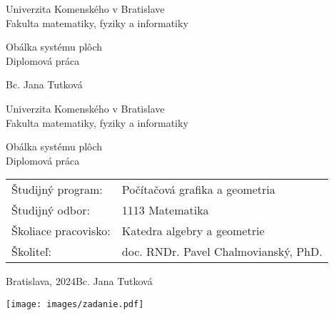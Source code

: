 \documentclass[12pt, twoside]{book}
\theoremstyle{definition}
\def\mfrok{2024}
\def\mfnazov{Obálka systému plôch}
\def\mftyp{Diplomová práca}
\def\mfautor{Bc. Jana Tutková}
\def\mfskolitel{doc. RNDr. Pavel Chalmovianský, PhD. }
\def\mfkonzultant{tit. Meno Priezvisko, tit. }
\def\mfmiesto{Bratislava, \mfrok}
\def\mfodbor{1113 Matematika}
\def\program{ Počítačová grafika a geometria }
\def\mfpracovisko{ Katedra algebry a geometrie }
\begin{document}
     
\frontmatter

\thispagestyle{empty}

\begin{center}
\sc\large
Univerzita Komenského v Bratislave\\
Fakulta matematiky, fyziky a informatiky

\vfill

{\LARGE\mfnazov}\\
\mftyp
\end{center}

\vfill

{\sc\large 
\noindent \mfrok \hfill
\mfautor
}

\eject %


\thispagestyle{empty}
\noindent

\begin{center}
\sc  
\large
Univerzita Komenského v Bratislave\\
Fakulta matematiky, fyziky a informatiky

\vfill

{\LARGE\mfnazov}\\
\mftyp
\end{center}

\vfill

\noindent
\begin{tabular}{ll}
Študijný program: & \program \\
Študijný odbor: & \mfodbor \\
Školiace pracovisko: & \mfpracovisko \\
Školiteľ: & \mfskolitel \\
\end{tabular}

\vfill


\noindent \mfmiesto \hfill \mfautor

\eject %





\newpage 
\thispagestyle{empty}
\hspace{-2cm}\texttt{[image: images/zadanie.pdf]}
\end{document}
